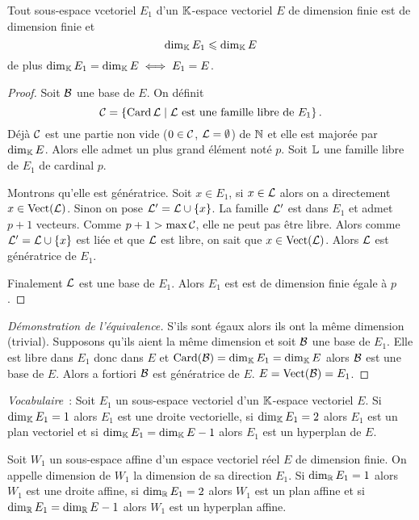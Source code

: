 \begin{theo}
  Tout sous-espace vcetoriel $E_1$ d'un $\mathbb{K}$-espace vectoriel $E$ de dimension finie est de dimension finie et
  \begin{equation}
    \operatorname{dim}_{\mathbb{K}} E_1 \leqslant \operatorname{dim}_{\mathbb{K}} E
  \end{equation}
de plus $\operatorname{dim}_{\mathbb{K}} E_1 = \operatorname{dim}_{\mathbb{K}} E \iff E_1 =E$.
\end{theo}
\begin{proof}
  Soit $\mathcal{B}$ une base de $E$. On définit 
\begin{equation}
  \mathcal{C}=\left\{\operatorname{Card} \mathcal{L}\mathrel{}\middle|\mathrel{}\mathcal{L} \text{~est une famille libre de } E_1\right\}. 
\end{equation}
Déjà $\mathcal{C}$ est une partie non vide ($0 \in \mathcal{C}$, $\mathcal{L}=\emptyset$) de $\mathbb{N}$ et elle est majorée par $\operatorname{dim}_{\mathbb{K}} E$. Alors elle admet un plus grand élément noté $p$. Soit $\mathbb{L}$ une famille libre de $E_1$ de cardinal $p$. 

Montrons qu'elle est génératrice. Soit $x \in E_1$, si $x \in \mathcal{L}$ alors on a directement $x \in \operatorname{Vect}(\mathcal{L})$. Sinon on pose $\mathcal{L}' = \mathcal{L} \cup \{x\}$. La famille $\mathcal{L}'$ est dans $E_1$ et admet $p+1$ vecteurs. Comme $p+1 > \max \mathcal{C}$, elle ne peut pas être libre. Alors comme $\mathcal{L}' =\mathcal{L}\cup\{x\}$ est liée et que $\mathcal{L}$ est libre, on sait que $x \in \operatorname{Vect}(\mathcal{L})$. Alors $\mathcal{L}$ est génératrice de $E_1$.

Finalement $\mathcal{L}$ est une base de $E_1$. Alors $E_1$ est est de dimension finie égale à $p$.
\end{proof}
\begin{proof}[Démonstration de l'équivalence]
  S'ils sont égaux alors ils ont la même dimension (trivial). Supposons qu'ils aient la même dimension et soit $\mathcal{B}$ une base de $E_1$. Elle est libre dans $E_1$ donc dans $E$ et $\operatorname{Card}(\mathcal{B})=\operatorname{dim}_{\mathbb{K}} E_1=\operatorname{dim}_{\mathbb{K}} E$ alors $\mathcal{B}$ est une base de $E$. Alors a fortiori $\mathcal{B}$ est génératrice de $E$. $E=\operatorname{Vect}(\mathcal{B})=E_1$.
\end{proof}

\emph{Vocabulaire}~: Soit $E_1$ un sous-espace vectoriel d'un $\mathbb{K}$-espace vectoriel $E$. Si $\operatorname{dim}_{\mathbb{K}} E_1=1$ alors $E_1$ est une droite vectorielle, si $\operatorname{dim}_{\mathbb{K}} E_1=2$ alors $E_1$ est un plan vectoriel et si $\operatorname{dim}_{\mathbb{K}} E_1 = \operatorname{dim}_{\mathbb{K}} E -1$ alors $E_1$ est un hyperplan de $E$.

\begin{defdef}
  Soit $W_1$ un sous-espace affine d'un espace vectoriel réel $E$ de dimension finie. On appelle dimension de $W_1$ la dimension de sa direction $E_1$. Si $\operatorname{dim}_{\mathbb{R}} E_1=1$ alors $W_1$ est une droite affine, si $\operatorname{dim}_{\mathbb{R}} E_1=2$ alors $W_1$ est un plan affine et si $\operatorname{dim}_{\mathbb{R}} E_1=\operatorname{dim}_{\mathbb{R}} E -1 $ alors $W_1$ est un hyperplan affine.
\end{defdef}

